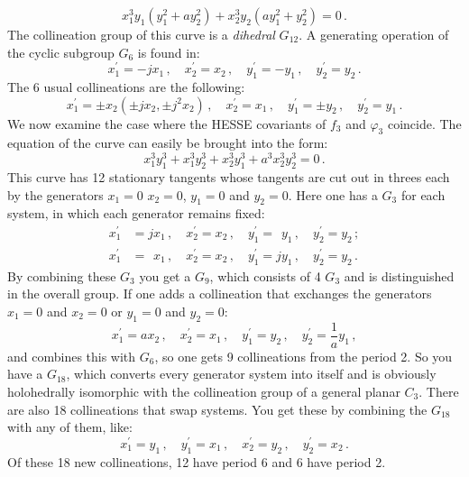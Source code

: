 \documentclass[leqno]{article}
\begin{document}
\begin{equation}\label{eq: 5.11}
x_1^3 y_1 (y_1^2 + a y_2^2) + x_2^3 y_2 (a y_1^2 + y_2^2) = 0 \, . \tag{11}
\end{equation}
The collineation group of this curve is a \textit{dihedral} $G_{12}$. A generating operation of the cyclic subgroup $G_6$ is found in:
\[
x_1^\prime = -j x_1 \, , \quad x_2^\prime = x_2 \, , \quad y_1^\prime =-y_1 \, , \quad y_2^\prime = y_2 \, .
\]
The 6 usual collineations are the following:
\[
x_1^\prime = \pm x_2(\pm j x_2 , \pm j^2 x_2) \, , \quad x_2^\prime = x_1 \, , \quad y_1^\prime = \pm y_2 \, , \quad y_2^\prime = y_1 \, . 
\]
We now examine the case where the HESSE covariants of $f_3$ and $\varphi_3$ coincide. The equation of the curve can easily be brought into the form:
\begin{equation}\label{eq: 5.12}
x_1^3 y_1^3 + x_1^3 y_2^3 + x_2^3 y_1^3 + a^3 x_2^3 y_2^3 = 0 \, . \tag{12}
\end{equation}
This curve has 12 stationary tangents whose tangents are cut out in threes each by the generators $x_1=0$ $x_2=0$, $y_1=0$ and $y_2=0$. Here one has a $G_3$ for each system, in which each generator remains fixed:
\begin{align*}
	x_1^\prime &= j x_1 \, , \quad  x_2^\prime = x_2 \, , \quad y_1^\prime = \phantom{j} y_1 \, , \quad y_2^\prime = y_2 \, ; \\
	x_1^\prime &= \phantom{j} x_1 \, , \quad x_2^\prime = x_2 \, , \quad y_1^\prime = j y_1 \, , \quad y_2^\prime = y_2 \, .
\end{align*}
By combining these $G_3$ you get a $G_9$, which consists of 4 $G_3$ and is distinguished in the overall group. If one adds a collineation that exchanges the generators $x_1 = 0$ and $x_2 = 0$ or $y_1 = 0$ and $y_2 = 0$: 
\[
x_1^\prime = a x_2 \, , \quad x_2^\prime = x_1 \, , \quad y_1^\prime = y_2 \, , \quad y_2^\prime = \frac{1}{a} y_1 \, , 
\]
and combines this with $G_6$, so one gets 9 collineations from the period 2. So you have a $G_{18}$, which converts every generator system into itself and is obviously holohedrally isomorphic with the collineation group of a general planar $C_3$. There are also 18 collineations that swap systems. You get these by combining the $G_{18}$ with any of them, like:
\[
x_1^\prime = y_1 \, , \quad y_1^\prime = x_1 \, , \quad x_2^\prime = y_2 \, , \quad y_2^\prime = x_2 \, . 
\]
Of these 18 new collineations, 12 have period 6 and 6 have period 2. \\
\end{document}
